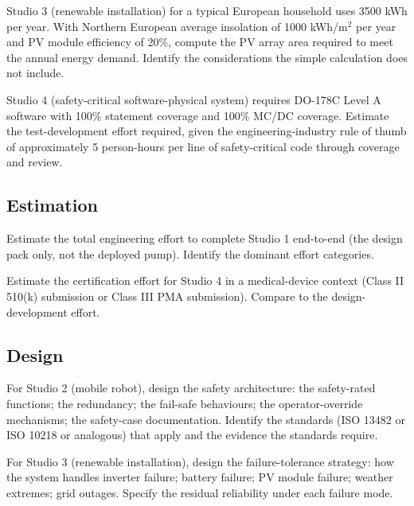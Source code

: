 \begin{exercise}
Studio 3 (renewable installation) for a typical European household uses 3500 kWh per year. With Northern European average insolation of 1000 kWh/m$^2$ per year and PV module efficiency of 20\%, compute the PV array area required to meet the annual energy demand. Identify the considerations the simple calculation does not include.
\end{exercise}

\begin{exercise}
Studio 4 (safety-critical software-physical system) requires DO-178C Level A software with 100\% statement coverage and 100\% MC/DC coverage. Estimate the test-development effort required, given the engineering-industry rule of thumb of approximately 5 person-hours per line of safety-critical code through coverage and review.
\end{exercise}

\subsection*{Estimation}

\begin{exercise}
Estimate the total engineering effort to complete Studio 1 end-to-end (the design pack only, not the deployed pump). Identify the dominant effort categories.
\end{exercise}

\begin{exercise}
Estimate the certification effort for Studio 4 in a medical-device context (Class II 510(k) submission or Class III PMA submission). Compare to the design-development effort.
\end{exercise}

\subsection*{Design}

\begin{exercise}
For Studio 2 (mobile robot), design the safety architecture: the safety-rated functions; the redundancy; the fail-safe behaviours; the operator-override mechanisms; the safety-case documentation. Identify the standards (ISO 13482 or ISO 10218 or analogous) that apply and the evidence the standards require.
\end{exercise}

\begin{exercise}
For Studio 3 (renewable installation), design the failure-tolerance strategy: how the system handles inverter failure; battery failure; PV module failure; weather extremes; grid outages. Specify the residual reliability under each failure mode.
\end{exercise}

